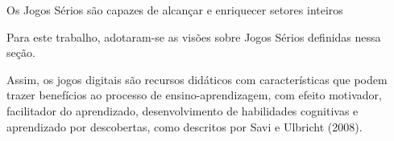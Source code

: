 







Os Jogos Sérios são capazes de alcançar e enriquecer setores inteiros 


Para este trabalho, adotaram-se as visões sobre Jogos Sérios definidas nessa seção. 


Assim, os jogos digitais são recursos didáticos com características que podem trazer benefícios ao processo de ensino-aprendizagem, com efeito motivador, facilitador do aprendizado, desenvolvimento de habilidades cognitivas e aprendizado por descobertas, como descritos por Savi e Ulbricht (2008).


